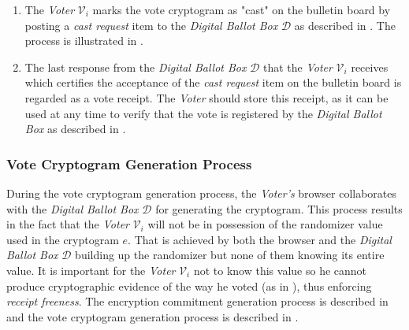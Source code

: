 \begin{enumerate}
    \item \label{itm: cast vote} The \textit{Voter} $\mathcal{V}_i$ marks the vote cryptogram as "cast" on the bulletin board by posting a \textit{cast request} item to the \textit{Digital Ballot Box} $\mathcal{D}$ as described in . The process is illustrated in .
    
    \item The last response from the \textit{Digital Ballot Box} $\mathcal{D}$ that the \textit{Voter} $\mathcal{V}_i$ receives which certifies the acceptance of the \textit{cast request} item on the bulletin board is regarded as a vote receipt. The \textit{Voter} should store this receipt, as it can be used at any time to verify that the vote is registered by the \textit{Digital Ballot Box} as described in .
\end{enumerate}
\color{black}











\subsubsection{Vote Cryptogram Generation Process} \label{sec: vote cryptogram generation process}
During the vote cryptogram generation process, the \textit{Voter's} browser collaborates with the \textit{Digital Ballot Box} $\mathcal{D}$ for generating the cryptogram. This process results in the fact that the \textit{Voter} $\mathcal{V}_i$ will not be in possession of the randomizer value used in the cryptogram $e$. That is achieved by both the browser and the \textit{Digital Ballot Box} $\mathcal{D}$ building up the randomizer but none of them knowing its entire value. It is important for the \textit{Voter} $\mathcal{V}_i$ not to know this value so he cannot produce cryptographic evidence of the way he voted (as in ), thus enforcing \textit{receipt freeness}. The encryption commitment generation process is described in  and the vote cryptogram generation process is described in .


